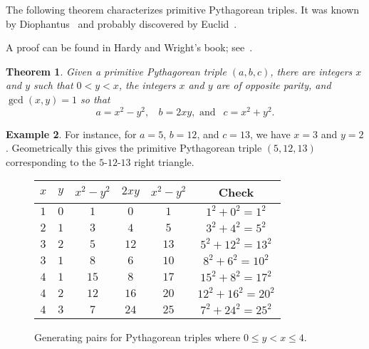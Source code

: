\documentclass[12pt,table]{article}
\newtheorem{theorem}{Theorem}[section]
\theoremstyle{definition}
\newtheorem{example}[theorem]{Example}
\theoremstyle{remark}
\newcommand{\vanish}[1]{}
\numberwithin{equation}{section}
\begin{document}
The following theorem characterizes primitive Pythagorean triples.
It was known by Diophantus~\cite[Page 93]{Heath} and
probably discovered by Euclid~\cite{Euclid}.




A proof can be found in Hardy and Wright's book; 
see~\cite[XIII, 13.2]{Hardy_and_Wright}.



\vanish{
Also see page 295 of Heath for
Fermat's area of triangle result.}



\begin{theorem}
Given a primitive
Pythagorean triple $(a,b,c)$, there are integers
$x$ and $y$ such that $0 < y < x$, 
the integers
$x$ and $y$ are of opposite parity,
and
$\gcd(x,y) = 1$
so that
\begin{equation}
\label{equation_primitive_Pythagorean_triple}
     a = x^2-y^2, \:\:\:\: 
     b = 2xy, \mbox{  and  } \:\: c=x^2+y^2.
\end{equation}
\end{theorem}


\begin{example}
{\rm
For instance, 
for
$a = 5$, $b = 12$, and $c = 13$,
we have
$x = 3$
and $y = 2$.
Geometrically this gives the primitive Pythagorean triple
$(5, 12, 13)$ corresponding to the 
$5$-$12$-$13$ right triangle. 
}
\end{example}



\begin{figure}
\begin{center}
\begin{tabular}{ c|c|c|c|c|c } 

 $x$ & $y$ & $x^2 - y^2$ & $2xy$ & $x^2 - y^2$ & Check \\  
 \hline
 $1$ & $0$ & $1$ & $0$ & $1$ & $1^2 + 0^2 = 1^2$ \\  
 $2$ & $1$ & $3$ & $4$ & $5$ & $3^2 + 4^2 = 5^2$ \\  
 $3$ & $2$ & $5$ & $12$ & $13$ & $5^2 + 12^2 = 13^2$ \\  
 $3$ & $1$ & $8$ & $6$ & $10$ & $8^2 + 6^2 = 10^2$ \\  
 $4$ & $1$ & $15$ & $8$ & $17$ & $15^2 + 8^2 = 17^2$ \\  
 $4$ & $2$ & $12$ & $16$ & $20$ & $12^2 + 16^2 = 20^2$ \\  
 $4$ & $3$ & $7$ & $24$ & $25$ & $7^2 + 24^2 = 25^2$ \\  
\end{tabular}
\caption{Generating pairs for Pythagorean triples where
$0 \leq y < x \leq 4$.}
\end{center}
\label{figure_triples}
\end{figure}
\end{document}
